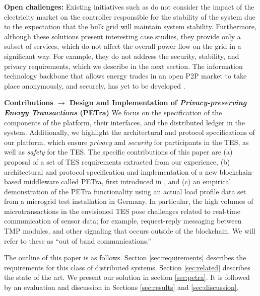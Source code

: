\documentclass[sigplan]{acmart}
\newcommand{\Karla}[1]{\todo[color=green!50, linecolor=black!50]{\textbf{Karla}: #1}}
\newcommand{\Aron}[1]{\todo[color=blue!30, linecolor=black!50]{\textbf{Aron}: #1}}
\begin{document}

\textbf{Open challenges:} Existing initiatives such as \cite{PowerLedger,Lo3Patent,TenneT}
do not consider the impact of the electricity market on the controller responsible for the stability of the system due to the expectation that the bulk grid will maintain system stability. Furthermore, although these solutions present interesting case studies, they provide only a subset of services, which do not affect the overall power flow on the grid in a significant way. For example, they do not address the security, stability, and privacy requirements, which we describe in the next section. The information technology backbone that allows energy trades in an open P2P market to take place anonymously, and securely, has yet to be developed \cite{7747895,7725894}.

\textbf{Contributions $\rightarrow$ Design and Implementation of  \emph{Privacy-preserving
    Energy Transactions} (PETra)}
We focus on the specification of the components of the platform, their interfaces, and the distributed ledger in the system. Additionally, we highlight the architectural and protocol specifications of our platform, which ensure \emph{privacy} and \emph{security} for participants in the TES, as well as \emph{safety} for the TES. 
The specific contributions of this paper are (a) proposal of a set of TES requirements extracted from our experience, (b) architectural and protocol specification and implementation of a new blockchain-based middleware called PETra, first introduced in  \cite{Laszka17}, and (c) an empirical demonstration of the PETra functionality using an actual load profile data set from a microgrid test installation in Germany.  In particular, the high volumes of microtransactions in the envisioned TES pose challenges related to real-time communication of sensor data; for example, request-reply messaging between TMP modules, and other signaling that occurs outside of the blockchain. We will refer to these as ``out of band communications.''

The outline of this paper is as follows. Section \ref{sec:requirements} describes the requirements for this class of distributed systems. Section \ref{sec:related} describes the state of the art. We present our solution in section \ref{sec:petra}. It is followed by an evaluation and discussion in Sections \ref{sec:results} and \ref{sec:discussion}.
\end{document}
